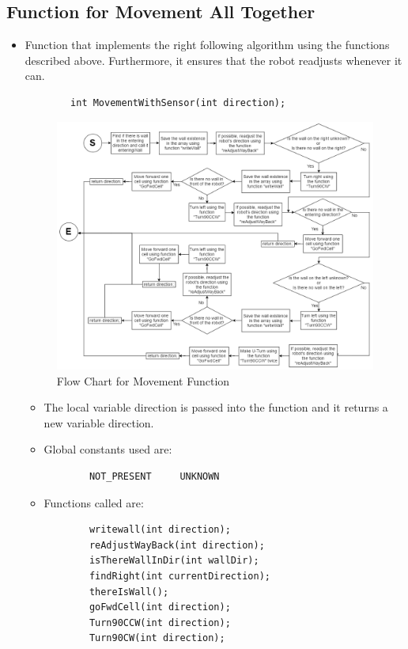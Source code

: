 \documentclass[11pt]{article}
\begin{document}
\subsection{Function for Movement All Together}
\begin{itemize}
\item Function that implements the right following algorithm using the functions described above. Furthermore, it ensures that the robot readjusts whenever it can.
	\begin{verbatim}
		int MovementWithSensor(int direction);
	\end{verbatim}
\begin{figure}[htp]
\centering
\includegraphics[scale=0.47]{images/Software_Flowchart/MovementWithSensor.png}
\caption{Flow Chart for Movement Function}
\label{}
\end{figure}
	\begin{itemize}
	\item The local variable direction is passed into the function and it returns a new variable direction.
	\item Global constants used are:
	\begin{verbatim}
		NOT_PRESENT     UNKNOWN
	\end{verbatim}
	\item Functions called are: 
	\begin{verbatim}
		writewall(int direction);
		reAdjustWayBack(int direction);
		isThereWallInDir(int wallDir);
		findRight(int currentDirection);
		thereIsWall();
		goFwdCell(int direction);
		Turn90CCW(int direction);
		Turn90CW(int direction);
	\end{verbatim}
	\end{itemize}
\end{itemize}
\newpage
\end{document}
